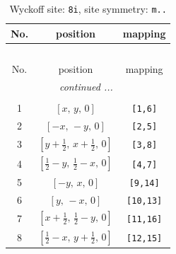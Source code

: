 \documentclass[fleqn,8pt]{jsarticle}
\begin{document}
\renewcommand{\arraystretch}{1.2}
\begin{longtable}{ccc}
\caption{Wyckoff site: {\tt 8i}, site symmetry: {\tt m..}}
 \\
 \hline \hline
No. & position & mapping \\ \hline \endfirsthead

\multicolumn{2}{l}{\tablename\ \thetable{}} \\
 \hline \hline
No. & position & mapping \\ \hline \endhead

 \hline \hline
\multicolumn{2}{r}{\footnotesize\it continued ...} \\ \endfoot

 \hline \hline
\multicolumn{2}{r}{} \\ \endlastfoot

1 & $\left[ x,\, y,\, 0 \right]$ & {\tt [1,6]} \\ \hline
2 & $\left[ - x,\, - y,\, 0 \right]$ & {\tt [2,5]} \\ \hline
3 & $\left[ y + \frac{1}{2},\, x + \frac{1}{2},\, 0 \right]$ & {\tt [3,8]} \\ \hline
4 & $\left[ \frac{1}{2} - y,\, \frac{1}{2} - x,\, 0 \right]$ & {\tt [4,7]} \\ \hline
5 & $\left[ - y,\, x,\, 0 \right]$ & {\tt [9,14]} \\ \hline
6 & $\left[ y,\, - x,\, 0 \right]$ & {\tt [10,13]} \\ \hline
7 & $\left[ x + \frac{1}{2},\, \frac{1}{2} - y,\, 0 \right]$ & {\tt [11,16]} \\ \hline
8 & $\left[ \frac{1}{2} - x,\, y + \frac{1}{2},\, 0 \right]$ & {\tt [12,15]} \\
\end{longtable}
\renewcommand{\arraystretch}{1.2}
\end{document}
